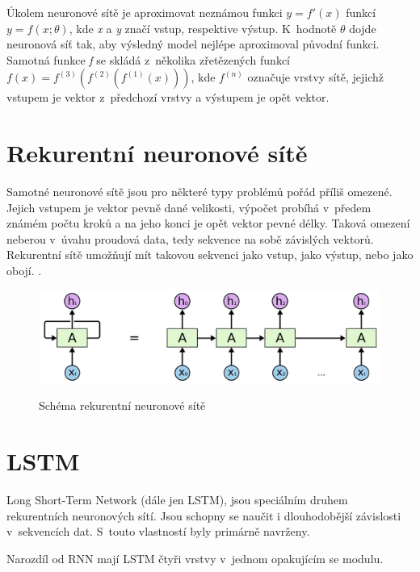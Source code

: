 Úkolem neuronové sítě je aproximovat neznámou funkci $ y=f'(x)$
funkcí $ y=f(x;\theta )$, kde \emph{x} a \emph{y} značí vstup, 
respektive výstup.
K~hodnotě $\theta$ dojde neuronová síť tak,
aby výsledný model nejlépe aproximoval původní funkci.
Samotná funkce \emph{f} se skládá z~několika zřetězených funkcí 
$f(x)=f^{(3)}(f^{(2)}(f^{(1)}(x)))$,
kde $f^{(n)}$ označuje vrstvy sítě, 
jejichž vstupem je vektor z~předchozí vrstvy 
a výstupem je opět vektor.
\cite{Goodfellow-et-al-2016}


\section{Rekurentní neuronové sítě}
Samotné neuronové sítě jsou pro některé typy problémů pořád příliš omezené.
Jejich vstupem je vektor pevně dané velikosti, 
výpočet probíhá v~předem známém počtu kroků 
a na jeho konci je opět vektor pevné délky.
Taková omezení neberou v~úvahu proudová data, 
tedy sekvence na sobě závislých vektorů.
Rekurentní sítě umožňují mít takovou sekvenci jako vstup, 
jako výstup, nebo jako obojí.
\cite{Karpathy_RNNs}.

\begin{figure}[h]\centering
    \centering
    \includegraphics[width=0.6\linewidth]{obrazky/RNNSchema.png}\\[1pt]  
    \caption{Schéma rekurentní neuronové sítě\cite{colah_lstm}}    
    \label{obrazekSchemaRekurentniNeuronoveSite}
\end{figure}

\section{LSTM}
\label{lstmTeorie}
Long Short-Term Network (dále jen LSTM), 
jsou speciálním druhem rekurentních neuronových sítí.
Jsou schopny se naučit i dlouhodobější závislosti v~sekvencích dat.
S~touto vlastností byly primárně navrženy.\cite{colah_lstm}
\par

Narozdíl od RNN mají LSTM čtyři vrstvy v~jednom opakujícím se modulu.



